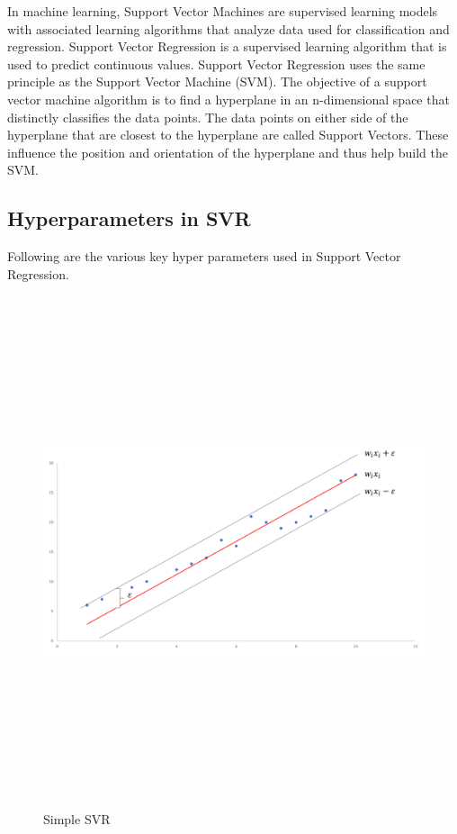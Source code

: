 In machine learning, Support Vector Machines are supervised learning
models with associated learning algorithms that analyze data used for
classification and regression. Support Vector Regression \cite{D} is a
supervised learning algorithm that is used to predict continuous
values. Support Vector Regression uses the same principle as the
Support Vector Machine (SVM). The objective of a support vector
machine algorithm is to find a hyperplane in an n-dimensional space
that distinctly classifies the data points. The data points on either
side of the hyperplane that are closest to the hyperplane are called
Support Vectors. These influence the position and orientation of the
hyperplane and thus help build the SVM.

\subsection{Hyperparameters in SVR}

Following are the various key hyper parameters used in Support Vector Regression.
\begin{figure}[h]
\centering
\includegraphics[width=1\textwidth, height=15cm]{./figures/svm.png}
\caption{Simple SVR}
\label{fig1}
\end{figure}

